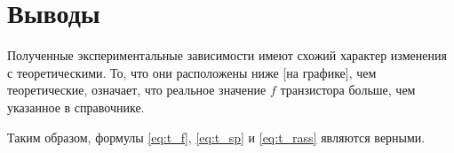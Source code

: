 \documentclass[a4paper,14pt]{extarticle}
\begin{document}
\section{Выводы}

Полученные экспериментальные зависимости имеют схожий характер изменения с теоретическими. То, что они расположены ниже [на графике], чем теоретические, означает, что реальное значение $f$ транзистора больше, чем указанное в справочнике. 

Таким образом, формулы \ref{eq:t_f}, \ref{eq:t_sp} и \ref{eq:t_rass} являются верными.
\end{document}
